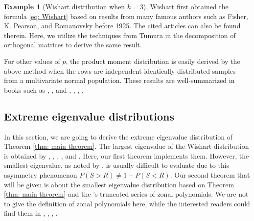 \documentclass{amsart}
\theoremstyle{definition}
\newtheorem{example}[theorem]{Example}
\numberwithin{equation}{section}
\begin{document}
\begin{example}[Wishart distribution when $k=3$]
Wishart first obtained the formula \eqref{eq: Wishart} based on results from many famous authors such as Fisher, K. Pearson, and Romanovsky before 1925. The cited articles can also be found therein. Here, we utilize the techniques from Tumura in the decomposition of orthogonal matrices to derive the same result.


For other values of $p$, the product moment distribution is easily derived by the above method when the rows are independent identically distributed samples from a multivariate normal population. These results are well-summarized in books such as \cite{anderson1958introduction}, \cite{srivastava2009introduction}, and \cite{muirhead1982aspects}, \cite{eaton2007multivariate}, \cite{gupta2018matrix}, \cite{mathai2022mul}.
\end{example}    

\subsection{Extreme eigenvalue distributions}

In this section, we are going to derive the extreme eigenvalue distribution of Theorem \ref{thm: main theorem}. The largest eigenvalue of the Wishart distribution is obtained by \cite{roy1953heuristic}, \cite{sugiyama1967distribution,sugiyama1972distributions}, \cite{johnstone2001distribution,johnstone2008multivariate}, \cite{johnstone2017roy}, and \cite{kan2019densities}. Here, our first theorem implements them. However, the smallest eigenvalue, as noted by \cite{constantine1963some}, is usually difficult to evaluate due to this asymmetry phenomenon $P(S>R) \neq 1 - P(S<R)$. Our second theorem that will be given is about the smallest eigenvalue distribution based on Theorem \ref{thm: main theorem} and the \cite{khatri1972exact}'s truncated series of zonal polynomials. We are not to give the definition of zonal polynomials here, while the interested readers could find them in \cite{hua1963harmonic}, \cite{muirhead1982aspects}, \cite{macdonald1998symmetric}, \cite{Vilenkin2010RepresentationOL}.
\end{document}
